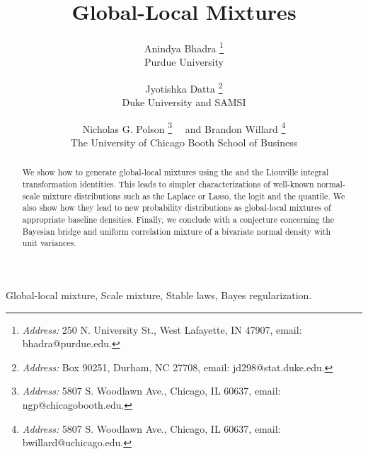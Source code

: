 \documentclass[letterpaper,11pt]{article}
\begin{document}



\title{Global-Local Mixtures}

\author{Anindya Bhadra  \footnote{{\em Address:} 250 N. University St., West Lafayette, IN 47907, email: bhadra@purdue.edu.} \\Purdue University
\and Jyotishka Datta  \footnote{{\em Address:} Box 90251, Durham, NC 27708, email: jd298@stat.duke.edu.}\\ Duke University and SAMSI\\
\and Nicholas G. Polson \footnote{{\em Address:} 5807 S. Woodlawn Ave., Chicago, IL 60637, email: ngp@chicagobooth.edu.}  \ \ and Brandon Willard \footnote{{\em Address:} 5807 S. Woodlawn Ave., Chicago, IL 60637, email: bwillard@uchicago.edu.} \\The University of Chicago Booth School of Business}

\maketitle
\begin{abstract}
\noindent 
We show how to generate global-local mixtures using the \CS and the Liouville integral transformation identities. This leads to simpler characterizations of well-known normal-scale mixture distributions such as the Laplace or Lasso, the logit and the quantile. We also show how they lead to new probability distributions as global-local mixtures of appropriate baseline densities. Finally, we conclude with a conjecture concerning the Bayesian bridge and uniform correlation mixture of a bivariate normal density with unit variances. 
\end{abstract}

Global-local mixture, Scale mixture, Stable laws, Bayes regularization.
\end{document}
